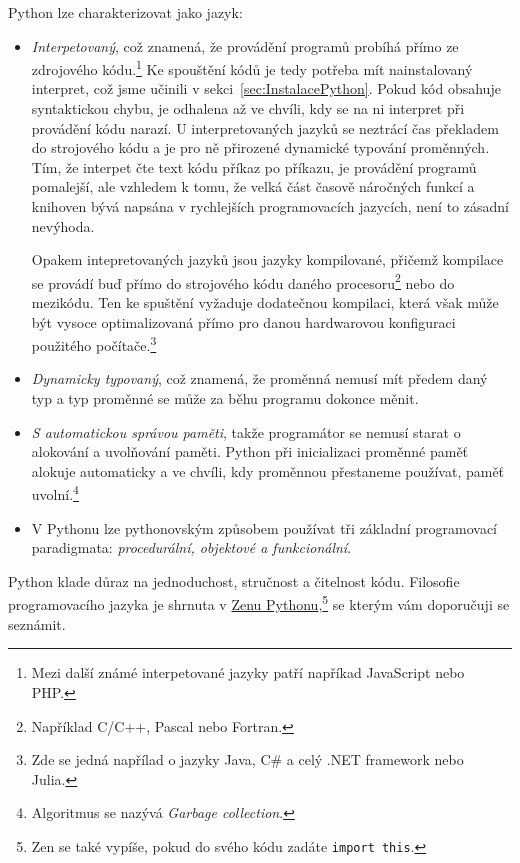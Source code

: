 \documentclass[a4paper,11pt,twoside]{article}
\def\code#1{\textnormal{\texttt{#1}}}
\theoremstyle{red}
\theoremstyle{green}
\begin{document}
    Python lze charakterizovat jako jazyk:
    \begin{itemize}
        \item 
            \emph{Interpetovaný}, což znamená, že provádění programů probíhá přímo ze zdrojového kódu.\footnote{
                Mezi další známé interpetované jazyky patří napříkad JavaScript nebo PHP.
            }
            Ke spouštění kódů je tedy potřeba mít nainstalovaný interpret, což jsme učinili v sekci~\ref{sec:InstalacePython}.
            Pokud kód obsahuje syntaktickou chybu, je odhalena až ve chvíli, kdy se na ni interpret při provádění kódu narazí.
            U interpretovaných jazyků se neztrácí čas překladem do strojového kódu a je pro ně přirozené dynamické typování proměnných.
            Tím, že interpet čte text kódu příkaz po příkazu, je provádění programů pomalejší, ale vzhledem k tomu, že velká část časově náročných funkcí a knihoven bývá napsána v rychlejších programovacích jazycích, není to zásadní nevýhoda.
            
            Opakem intepretovaných jazyků jsou jazyky kompilované, přičemž kompilace se provádí buď přímo do strojového kódu daného procesoru\footnote{Například C/C++, Pascal nebo Fortran.} nebo do mezikódu. Ten  ke spuštění vyžaduje dodatečnou kompilaci, která však může být vysoce optimalizovaná přímo pro danou hardwarovou konfiguraci použitého počítače.\footnote{Zde se jedná napřílad o jazyky Java, C\# a celý .NET framework nebo Julia.}

        \item 
            \emph{Dynamicky typovaný}, což znamená, že proměnná nemusí mít předem daný typ a typ proměnné se může za běhu programu dokonce měnit.
        
        \item 
            \emph{S automatickou správou paměti}, takže programátor se nemusí starat o alokování a uvolňování paměti. 
            Python při inicializaci proměnné paměť alokuje automaticky a ve chvíli, kdy proměnnou přestaneme používat, paměť uvolní.\footnote{Algoritmus se nazývá \emph{Garbage collection}.} 

        \item
            V Pythonu lze pythonovským způsobem používat tři základní programovací paradigmata: \emph{procedurální, objektové a funkcionální}.
    \end{itemize}
         
    Python klade důraz na jednoduchost, stručnost a čitelnost kódu.
    Filosofie programovacího jazyka je shrnuta v \href{https://www.python.org/dev/peps/pep-0020/}{Zenu Pythonu},\footnote{
        Zen se také vypíše, pokud do svého kódu zadáte \code{import this}.
    } se kterým vám doporučuji se seznámit.
\end{document}
